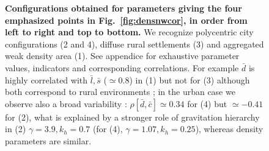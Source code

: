 \documentclass{article}
\begin{document}
\begin{figure}[h!]
	\caption{\textbf{Configurations obtained for parameters giving the four emphasized points in Fig.~\ref{fig:densnwcor}, in order from left to right and top to bottom.} We recognize polycentric city configurations (2 and 4), diffuse rural settlements (3) and aggregated weak density area (1). See appendice for exhaustive parameter values, indicators and corresponding correlations. For example $\bar{d}$ is highly correlated with $\bar{l},\bar{s}$ ($\simeq$0.8) in (1) but not for (3) although both correspond to rural environments ; in the urban case we observe also a broad variability : $\rho[\bar{d},\bar{c}]\simeq 0.34$ for (4) but $\simeq-0.41$ for (2), what is explained by a stronger role of gravitation hierarchy in (2) $\gamma=3.9,k_h=0.7$ (for (4), $\gamma=1.07,k_h=0.25$), whereas density parameters are similar.\label{fig:configexamples}}
\end{figure}
\end{document}
